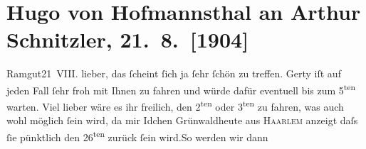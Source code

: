 

         
         \renewcommand{\erwaehntePersonen}{Personen: Ida Grünwald, Hugo von Hofmannsthal, Gertrude von Hofmannsthal}
         \renewcommand{\erwaehnteOrte}{Orte: Bad Aussee, Bad Ischl, Bozen, Haarlem, Ramgut, Rodaun, Trient, Val Sugana, Venedig, Wien, Wolfgangsee}
         \renewcommand{\erwaehnteWerke}{Werke: Oedipus und die Sphinx. Tragödie in drei Aufzügen}
               \section[Hugo von Hofmannsthal an Arthur Schnitzler, 21. 8. {[}1904{]}]{ Hugo von Hofmannsthal an Arthur Schnitzler, 21. 8. {[}1904{]}}\nopagebreak{}\rehead{ }\begin{ledgroupsized}[t]{13cm}\normalsize\beginnumbering{} \toendnotes[C]{\smallbreak\pagebreak[2]} 
\toendnotes[C]{\smallbreak}\pstart
           \raggedleft{}{\pb}Ramgut21 VIII.\pend
           \pstart{}lieber, \pend\pstart
           das ſcheint ſich ja ſehr ſchön zu treffen. Gerty iſt auf jeden Fall ſehr froh mit Ihnen zu fahren und würde dafür
               eventuell bis zum 5\textsuperscript{ten} warten. Viel lieber wäre es ihr freilich, den 2\textsuperscript{ten} oder 3\textsuperscript{ten} zu fahren, was auch wohl möglich ſein wird, da mir Idchen Grünwaldheute aus \textsc{Haarlem} anzeigt daſs ſie pünktlich den 26\textsuperscript{ten} zurück ſein wird.\hspace*{1.5em}So werden wir dann

\end{ledgroupsized}
